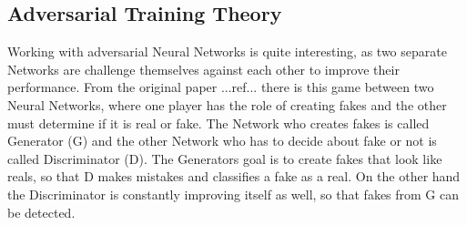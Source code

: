 \subsection{Adversarial Training Theory}\label{sec:adv_theory}
Working with adversarial Neural Networks is quite interesting, as two separate Networks are challenge themselves against each other to improve their performance.
From the original paper ...ref... there is this game between two Neural Networks, where one player has the role of creating fakes and the other must determine if it is real or fake.
The Network who creates fakes is called Generator (G) and the other Network who has to decide about fake or not is called Discriminator (D).
The Generators goal is to create fakes that look like reals, so that D makes mistakes and classifies a fake as a real.
On the other hand the Discriminator is constantly improving itself as well, so that fakes from G can be detected.